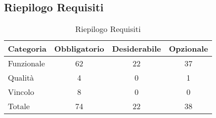 \subsection{Riepilogo Requisiti}{ 
\renewcommand*{\arraystretch}{1.4} 
\begin{table}[h] 
 \begin{center} 
\begin{tabular}[c]{| p{2.5cm} | c | c | c |}  
\hline \textbf{Categoria} & \textbf{Obbligatorio} & \textbf{Desiderabile} & \textbf{Opzionale} \\ \hline 
Funzionale & 62 & 22 & 37\\ 
 \hline 
Qualità & 4 & 0 & 1\\ 
 \hline 
Vincolo & 8 & 0 & 0\\ 
 \hline 
Totale & 74 & 22 & 38\\ 
 \hline 
\end{tabular} 
 \caption{Riepilogo Requisiti\label{tab:riepilogo}}\end{center} 
 \end{table}}